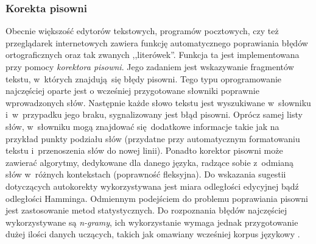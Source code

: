 \documentclass[a4paper, twoside, 12pt]{report}
\begin{document}
            \subsubsection{Korekta pisowni}
                Obecnie większość edytorów tekstowych, programów pocztowych, czy też przeglądarek internetowych zawiera
                funkcję automatycznego poprawiania błędów ortograficznych
                oraz tak zwanych ,,literówek''. Funkcja ta jest implementowana przy pomocy \emph{korektora pisowni}. Jego
                zadaniem jest wskazywanie fragmentów tekstu, w~których znajdują się błędy pisowni. Tego typu oprogramowanie
                najczęściej oparte jest o wcześniej przygotowane słowniki poprawnie wprowadzonych słów. Następnie każde
                słowo tekstu jest wyszukiwane w~słowniku i~w~przypadku jego braku, sygnalizowany jest błąd pisowni. Oprócz
                samej listy słów, w~słowniku mogą znajdować się dodatkowe informacje takie jak na przykład punkty podziału
                słów (przydatne przy automatycznym formatowaniu tekstu i~przenoszenia słów do nowej linii). Ponadto korektor
                pisowni może zawierać algorytmy, dedykowane dla danego języka, radzące sobie z~odmianą słów w~różnych
                kontekstach (poprawność fleksyjna). Do wskazania sugestii dotyczących autokorekty wykorzystywana jest miara
                odległości edycyjnej bądź odległości Hamminga. Odmiennym podejściem do problemu poprawiania pisowni jest zastosowanie
                metod statystycznych. Do rozpoznania błędów najczęściej wykorzystywane są \emph{n-gramy}, ich wykorzystanie
                wymaga jednak przygotowanie dużej ilości danych uczących, takich jak omawiany wcześniej korpus językowy
                \cite{SPELLCHECKING}.
\end{document}

